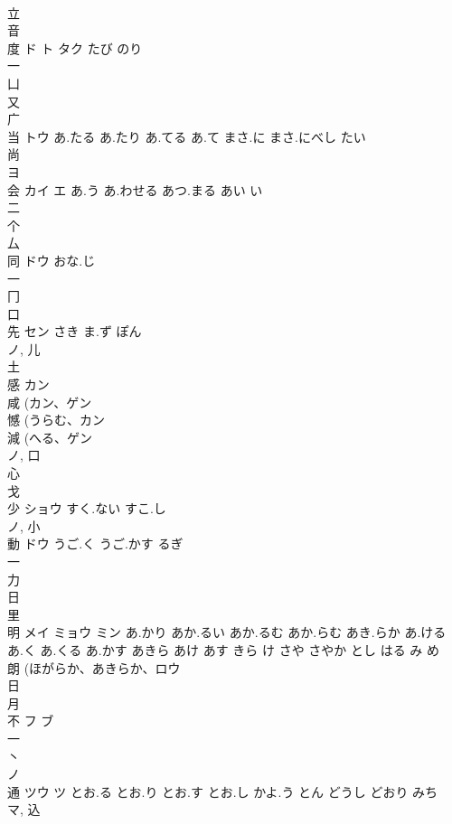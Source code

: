\documentclass[8pt]{extreport}
\begin{document}
\begin{CJK}{UTF8}{min}
\\	立 
\\	音 
\\	度	ド ト タク	たび のり	
\\	一 
\\	凵 
\\	又 
\\	广 
\\	当	トウ	あ.たる あ.たり あ.てる あ.て まさ.に まさ.にべし たい	
\\	尚 
\\	ヨ	
\\	会	カイ エ	あ.う あ.わせる あつ.まる あい い	
\\	二 
\\	个 
\\	厶 
\\	同	ドウ	おな.じ	
\\	一 
\\	冂 
\\	口 
\\	先	セン	さき ま.ず ぽん	
\\	ノ, 儿 
\\	土 
\\	感	カン		
\\	咸 (カン、ゲン 
\\	憾 (うらむ、カン 
\\	減 (へる、ゲン 
\\	ノ, 口 
\\	心 
\\	戈 
\\	少	ショウ	すく.ない すこ.し	
\\	ノ, 小 
\\	動	ドウ	うご.く うご.かす るぎ	
\\	一 
\\	力 
\\	日 
\\	里 
\\	明	メイ ミョウ ミン	あ.かり あか.るい あか.るむ あか.らむ あき.らか あ.ける あ.く あ.くる あ.かす あきら あけ あす きら け さや さやか とし はる み め	
\\	朗 (ほがらか、あきらか、ロウ 
\\	日 
\\	月 
\\	不	フ ブ		
\\	一 
\\	丶 
\\	ノ	
\\	通	ツウ ツ	とお.る とお.り とお.す とお.し かよ.う とん どうし どおり みち	
\\	マ, 込 

\end{CJK}
\end{document}
